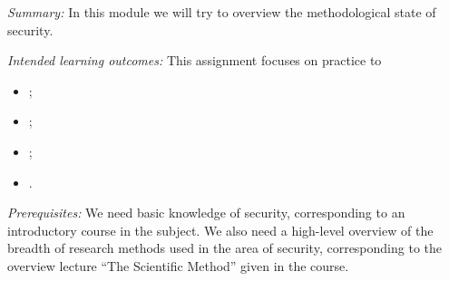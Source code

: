 
\emph{Summary:}
In this module we will try to overview the methodological state of security.

\emph{Intended learning outcomes:}
This assignment focuses on practice to
\begin{itemize}
  \item \LOrelate;
  \item \LOevaluate;
  \item \LOapply;
  \item \LOcomm.
\end{itemize}

\emph{Prerequisites:}
We need basic knowledge of security, corresponding to an introductory course in 
the subject.
We also need a high-level overview of the breadth of research methods used in 
the area of security, corresponding to the overview lecture \enquote{The 
Scientific Method} given in the course.
